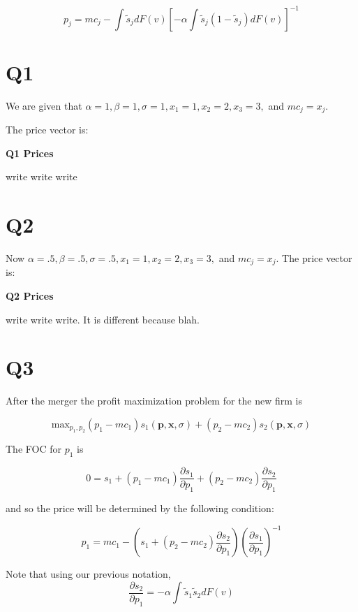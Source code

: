 \documentclass{article}
\newcommand{\1}{\mathbbm{1}}
\begin{document}
$$p_j = mc_j - \int \tilde{s}_j dF(v)[ -\alpha \int \tilde{s}_j(1-\tilde{s}_j)dF(v)]^{-1}$$

\section{Q1}
We are given that $\alpha = 1, \beta = 1, \sigma = 1, x_1 = 1, x_2 = 2, x_3 = 3,$ and $mc_j = x_j$. 

The price vector is: 

\begin{center}
	\centering
	\textbf{Q1 Prices }\par\medskip
	\scalebox{1}{
		
	}
\end{center}

\color{red}
write write write
\color{black}

\section{Q2}
Now $\alpha = .5, \beta = .5, \sigma = .5, x_1 = 1, x_2 = 2, x_3 = 3,$ and $mc_j = x_j$. 
The price vector is: 

\begin{center}
	\centering
	\textbf{Q2 Prices}\par\medskip
	\scalebox{1}{
		
	}
\end{center}

\color{red}
write write write. It is different because blah.
\color{black}


\section{Q3}
After the merger the profit maximization problem for the new firm is  

$$\text{max}_{p_1, p_2} (p_1 - mc_1)s_1(\bm p, \bm x, \sigma) + (p_2 - mc_2)s_2(\bm p, \bm x, \sigma)$$

The FOC for $p_1$ is 

$$0 = s_1 + (p_1 - mc_1)\frac{\partial s_1}{\partial p_1}   + (p_2 - mc_2)\frac{\partial s_2}{\partial p_1}$$

and so the price will be determined by the following condition:

$$p_1 = mc_1 - (s_1 + (p_2 - mc_2)\frac{\partial s_2}{\partial p_1})(\frac{\partial s_1}{\partial p_1})^{-1}$$

Note that using our previous notation,
$$\frac{\partial s_2}{\partial p_1} = - \alpha \int \tilde{s}_1\tilde{s}_2dF(v)$$
\end{document}
